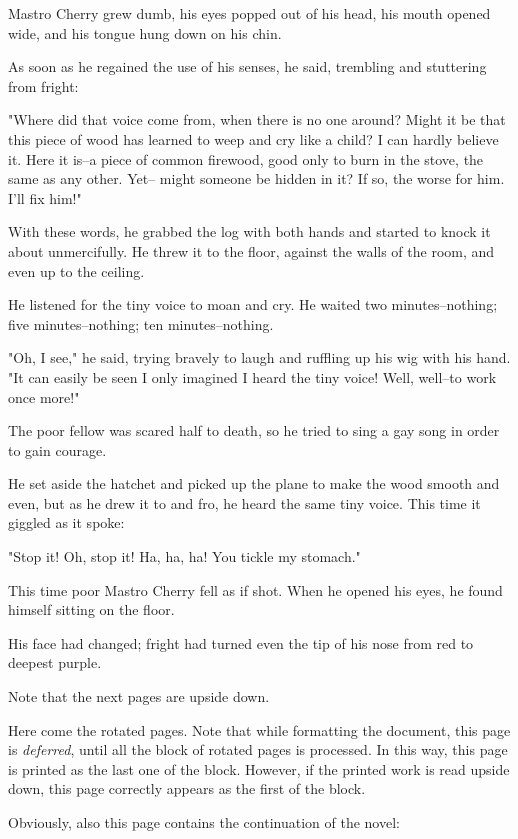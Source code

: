 \documentclass[12pt,twoside]{article}
\begin{document}
{  Mastro Cherry grew dumb, his eyes popped out of his
  head, his mouth opened wide, and his tongue hung down
  on his chin.
  
  As soon as he regained the use of his senses, he said,
  trembling and stuttering from fright:
  
  "Where did that voice come from, when there is no
  one around?  Might it be that this piece of wood has
  learned to weep and cry like a child?  I can hardly
  believe it.  Here it is--a piece of common firewood, good
  only to burn in the stove, the same as any other.  Yet--
  might someone be hidden in it?  If so, the worse for him.
  I'll fix him!"
  
  With these words, he grabbed the log with both hands
  and started to knock it about unmercifully.  He threw it
  to the floor, against the walls of the room, and even up
  to the ceiling.
  
  He listened for the tiny voice to moan and cry.
  He waited two minutes--nothing; five minutes--nothing;
  ten minutes--nothing.
  
  "Oh, I see," he said, trying bravely to laugh and
  ruffling up his wig with his hand.  "It can easily be seen
  I only imagined I heard the tiny voice!  Well, well--to
  work once more!"

  The poor fellow was scared half to death, so he tried
  to sing a gay song in order to gain courage.
  
  He set aside the hatchet and picked up the plane to
  make the wood smooth and even, but as he drew it to
  and fro, he heard the same tiny voice.  This time it giggled
  as it spoke:
  
  "Stop it!  Oh, stop it!  Ha, ha, ha! You tickle my stomach."
  
  This time poor Mastro Cherry fell as if shot.  When
  he opened his eyes, he found himself sitting on the floor.
  
  His face had changed; fright had turned even the tip of
  his nose from red to deepest purple.

}
\bigskip
Note that the next pages are upside down.

\rotboxpages%
Here come the rotated pages. Note that while formatting the
document, this page is \emph{deferred}, until all the block of rotated
pages is processed. In this way, this page is printed as the last one
of the block. However, if the printed work is read upside down, this
page correctly appears as the first of the block.

Obviously, also this page contains the continuation of the novel:
\end{document}
